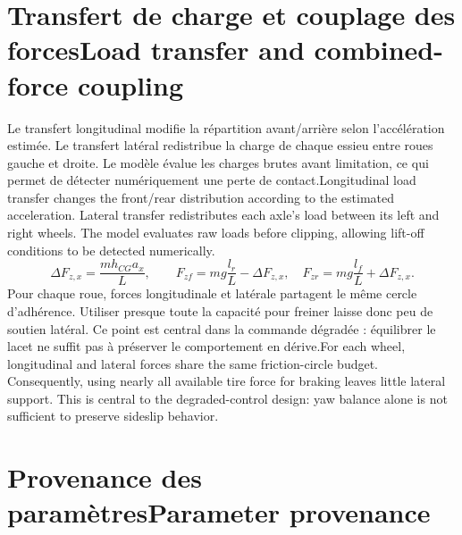\documentclass[11pt,a4paper,oneside]{report}
\newcommand{\bi}[2]{\iffrench #2\else #1\fi}
\renewcommand{\sec}[2]{\section{\bi{#1}{#2}}}
\begin{document}
\sec{Load transfer and combined-force coupling}{Transfert de charge et couplage des forces}
\bi{Longitudinal load transfer changes the front/rear distribution according to the estimated acceleration. Lateral transfer redistributes each axle's load between its left and right wheels. The model evaluates raw loads before clipping, allowing lift-off conditions to be detected numerically.}{Le transfert longitudinal modifie la répartition avant/arrière selon l'accélération estimée. Le transfert latéral redistribue la charge de chaque essieu entre roues gauche et droite. Le modèle évalue les charges brutes avant limitation, ce qui permet de détecter numériquement une perte de contact.}
\[
\Delta F_{z,x}=\frac{m h_{CG}a_x}{L},\qquad
F_{zf}=mg\frac{l_r}{L}-\Delta F_{z,x},\quad
F_{zr}=mg\frac{l_f}{L}+\Delta F_{z,x}.
\]
\bi{For each wheel, longitudinal and lateral forces share the same friction-circle budget. Consequently, using nearly all available tire force for braking leaves little lateral support. This is central to the degraded-control design: yaw balance alone is not sufficient to preserve sideslip behavior.}{Pour chaque roue, forces longitudinale et latérale partagent le même cercle d'adhérence. Utiliser presque toute la capacité pour freiner laisse donc peu de soutien latéral. Ce point est central dans la commande dégradée : équilibrer le lacet ne suffit pas à préserver le comportement en dérive.}
\sec{Parameter provenance}{Provenance des paramètres}
\end{document}

